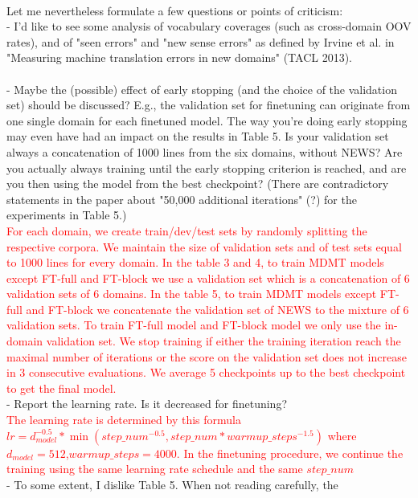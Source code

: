 \documentclass[12pt,times,a4paper,twoside]{article}
\newcommand{\fyTodo}[1]{\Todo[FY:]{\textcolor{orange}{#1}}}
\theoremstyle{definition}
\begin{document}
\\
Let me nevertheless formulate a few questions or points of criticism:
\\
- I'd like to see some analysis of vocabulary coverages (such as
cross-domain OOV rates), and of "seen errors" and "new sense errors" as defined by Irvine et al. in "Measuring machine translation errors in new domains" (TACL 2013).
\\
\fyTodo{extra experiments to do.}
\\
- Maybe the (possible) effect of early stopping (and the choice of the validation set) should be discussed? E.g., the validation set for
finetuning can originate from one single domain for each finetuned model. The way you're doing early stopping may even have had an impact on the results in Table 5. Is your validation set always a concatenation of 1000 lines from the six domains, without NEWS? Are you actually always training until the early stopping criterion is reached, and are you then using the model from the best checkpoint? (There are contradictory statements in the paper about "50,000  additional iterations" (?) for the experiments in Table 5.)
\\
\textcolor{red}{For each domain, we create train/dev/test sets by randomly splitting the respective corpora. We maintain the size of validation sets and of test sets equal to 1000 lines for every domain. In the table 3 and 4, to train MDMT models except FT-full and FT-block we use a validation set which is a concatenation of 6 validation sets of 6 domains. In the table 5, to train MDMT models except FT-full and FT-block we concatenate the validation set of NEWS to the mixture of 6 validation sets. To train FT-full model and FT-block model we only use the in-domain validation set. We stop training if either the training iteration reach the maximal number of iterations or the score on the validation set does not increase in 3 consecutive evaluations. We average 5 checkpoints up to the best checkpoint to get the final model.}
\\
- Report the learning rate. Is it decreased for finetuning?
\\
\textcolor{red}{The learning rate is determined by this formula $lr = d_{model}^{-0.5}*\min(step\_num^{-0.5},step\_num * warmup\_steps^{-1.5})$ where $d_{model}=512$,$warmup\_steps=4000$. In the finetuning procedure, we continue the training using the same learning rate schedule and the same $step\_num$}
\\
- To some extent, I dislike Table 5. When not reading carefully, the
\end{document}
